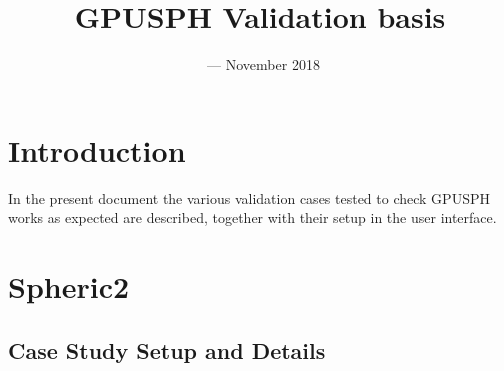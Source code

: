 \documentclass{../GPUSPHtemplate}
\title{GPUSPH Validation basis}
\author{}
\date{\currentver\ --- November 2018}
\begin{document}
\maketitle
\tableofcontents
\clearpage
\section{Introduction}

In the present document the various validation cases tested to check GPUSPH works as expected
are described, together with their setup in the user interface.

\section{Spheric2}


\subsection{Case Study Setup and Details}
   
\end{document}
